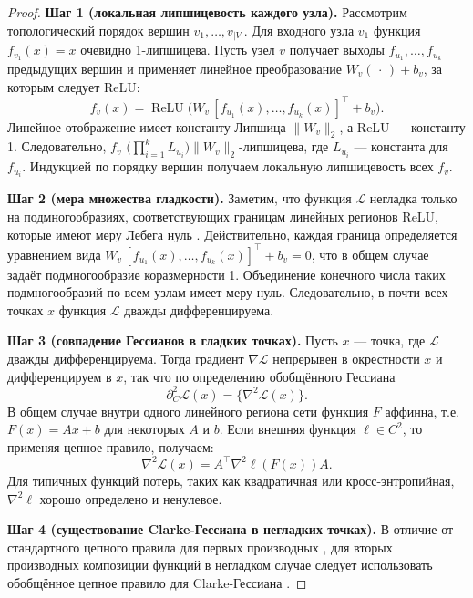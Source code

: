 \documentclass[11pt]{article}
\begin{document}
\begin{proof}
  \textbf{Шаг 1 (локальная липшицевость каждого узла).}
  Рассмотрим топологический порядок вершин $v_1,\dots,v_{|V|}$.
  Для входного узла $v_1$ функция~$f_{v_1}(x)=x$ очевидно 1-липшицева.
  Пусть узел $v$ получает выходы $f_{u_1},\dots,f_{u_k}$ предыдущих вершин
  и применяет линейное преобразование $W_v(\,\cdot\,)+b_v$, за которым следует ReLU:
  \[
    f_v(x)=\operatorname{ReLU}\!\bigl(W_v\,[f_{u_1}(x),\dots,f_{u_k}(x)]^{\!\top}+b_v\bigr).
  \]
  Линейное отображение имеет константу Липшица $\|W_v\|_2$, а ReLU — константу 1.
  Следовательно, $f_v$ $\bigl(\prod_{i=1}^k L_{u_i}\bigr)\|W_v\|_2$-липшицева,
  где $L_{u_i}$ — константа для $f_{u_i}$.
  Индукцией по порядку вершин получаем локальную липшицевость всех $f_v$.

  \medskip
  \textbf{Шаг 2 (мера множества гладкости).}
  Заметим, что функция $\mathcal L$ негладка только на подмногообразиях, соответствующих границам линейных
  регионов ReLU, которые имеют меру Лебега нуль \citep[Lemma 3.4]{pascanu2013revisiting}. Действительно,
  каждая граница определяется уравнением вида
  $W_v\,[f_{u_1}(x),\dots,f_{u_k}(x)]^{\!\top}+b_v = 0$, что в общем случае задаёт подмногообразие
  коразмерности 1. Объединение конечного числа таких подмногообразий по всем узлам имеет меру нуль.
  Следовательно, в почти всех точках $x$ функция $\mathcal L$ дважды дифференцируема.

  \medskip
  \textbf{Шаг 3 (совпадение Гессианов в гладких точках).}
  Пусть $x$ — точка, где $\mathcal L$ дважды дифференцируема.
  Тогда градиент $\nabla\mathcal L$ непрерывен в окрестности $x$ и дифференцируем в $x$,
  так что по определению обобщённого Гессиана
  \[
    \partial_C^{2}\mathcal L(x)=\bigl\{\nabla^{2}\mathcal L(x)\bigr\}.
  \]
  В общем случае внутри одного линейного региона сети функция $F$ аффинна, т.е. $F(x) = Ax + b$ для некоторых
  $A$ и $b$. Если внешняя функция $\ell \in C^2$, то применяя цепное правило, получаем:
  \[
    \nabla^2 \mathcal L(x) = A^\top \nabla^2 \ell(F(x)) A.
  \]
  Для типичных функций потерь, таких как квадратичная или кросс-энтропийная, $\nabla^2 \ell$ хорошо
  определено и ненулевое.

  \medskip
  \textbf{Шаг 4 (существование Clarke-Гессиана в негладких точках).}
  В отличие от стандартного цепного правила для первых производных \citep{bjarnason2005efficient}, для вторых
  производных композиции функций в негладком случае следует использовать обобщённое цепное правило для
  Clarke-Гессиана \citep{mordukhovich2012generalized, jeyakumar1999generalized}.


\end{proof}
\end{document}
